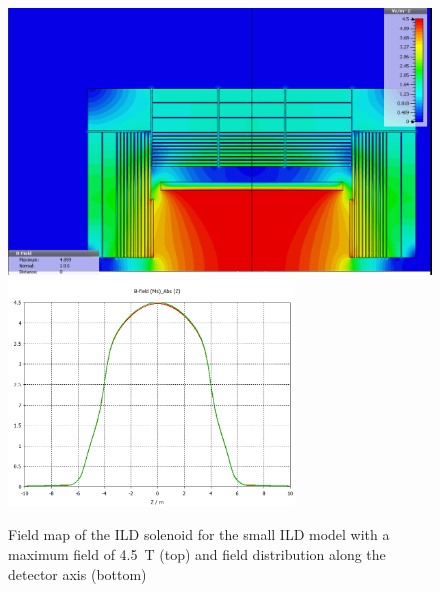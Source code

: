 \begin{figure}[h!]
    \centering
    \includegraphics[width=0.8\hsize]{Integration/fig/field_small_4_5.png}
    \includegraphics[width=0.8\hsize, height = 6cm]{Integration/fig/field_small_4_5_plot.png}
    \caption{Field map of the ILD solenoid for the small ILD model with a maximum field of 4.5~T (top) and field distribution along the detector axis (bottom)~\cite{ild:bib:Magnet_Simulations}}
    \label{ILD:fig:magnet_small}
\end{figure}


